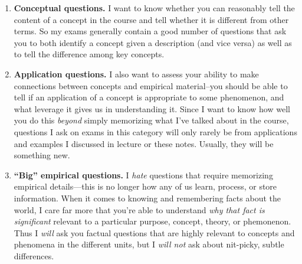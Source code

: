 \documentclass[
  letterpaper,
  DIV=11,
  numbers=noendperiod,
  oneside]{scrartcl}
\providecommand{\tightlist}{%
  \setlength{\itemsep}{0pt}\setlength{\parskip}{0pt}}
\begin{document}
\begin{enumerate}
\def\labelenumi{\arabic{enumi}.}
\tightlist
\item
  \textbf{Conceptual questions.} I want to know whether you can
  reasonably tell the content of a concept in the course and tell whether it is different from other terms. So my exams generally
  contain a good number of questions that ask you to both identify a
  concept given a description (and vice versa) as well as to tell the
  difference among key concepts.
\item
  \textbf{Application questions.} I also want to assess your ability to
  make connections between concepts and empirical material--you should
  be able to tell if an application of a concept is appropriate to some
  phenomenon, and what leverage it gives us in understanding
  it. Since I want
  to know how well you do this \emph{beyond} simply memorizing what I've
  talked about in the course, questions I ask on exams in this category
  will only rarely be from applications and examples I discussed in
  lecture or these notes. Usually, they will be something new.
\item
  \textbf{``Big'' empirical questions.} I \emph{hate} questions that
  require memorizing empirical details---this is no longer how any of us
  learn, process, or store information. When it comes to knowing and
  remembering facts about the world, I care far more that you're able to
  understand \emph{why that fact is significant} relevant to a
  particular purpose, concept, theory, or phemonenon. Thus I \emph{will}
  ask you factual questions that are highly relevant to concepts and
  phenomena in the different units, but I \emph{will not} ask about
  nit-picky, subtle differences.
\end{enumerate}
\end{document}
